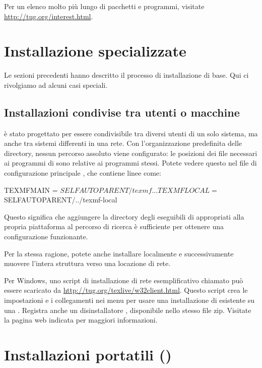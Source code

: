\documentclass{article}
\begin{document}
Per un elenco molto più lungo di pacchetti e programmi, visitate
\url{http://tug.org/interest.html}.


\section{Installazione specializzate}

Le sezioni precedenti hanno descritto il processo di installazione di base.
Qui ci rivolgiamo ad alcuni casi speciali.

\subsection{Installazioni condivise tra utenti o macchine}
\label{sec:sharedinstall}

\TL{} è stato progettato per essere condivisibile tra diversi utenti di un
solo sistema, ma anche tra sistemi differenti in una rete. Con
l'organizzazione predefinita delle directory, nessun percorso assoluto
viene configurato: le posizioni dei file necessari ai programmi di \TL{}
sono relative ai programmi stessi. Potete vedere questo nel file di
configurazione principale , che
contiene linee come:%
\begin{sverbatim}
TEXMFMAIN = $SELFAUTOPARENT/texmf
...
TEXMFLOCAL = $SELFAUTOPARENT/../texmf-local
\end{sverbatim}
Questo significa che aggiungere la directory degli eseguibili di \TL{}
appropriati alla propria piattaforma al percorso di ricerca è sufficiente
per ottenere una configurazione funzionante.

Per la stessa ragione, potete anche installare \TL{} localmente e
successivamente muovere l'intera struttura verso una locazione di rete.

Per Windows, uno script di installazione di rete esemplificativo chiamato
 può essere scaricato da
\url{http://tug.org/texlive/w32client.html}. Questo script crea le
impostazioni e i collegamenti nei menu per usare una installazione di
\TL{} esistente su una . Registra anche un disinstallatore
, disponibile nello stesso file zip. Visitate la
pagina web indicata per maggiori informazioni.


\section{Installazioni portatili (\USB)}
\label{sec:portable-tl}
\end{document}
